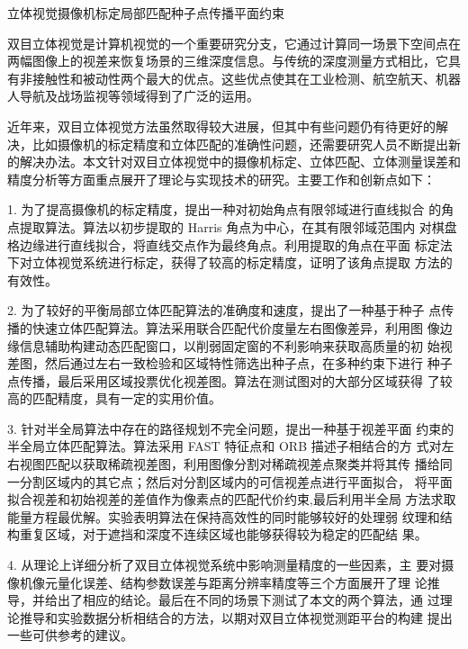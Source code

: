 \begin{Cabstract}{立体视觉}{摄像机标定}{局部匹配}{种子点传播}{平面约束}

双目立体视觉是计算机视觉的一个重要研究分支，它通过计算同一场景下空间点在两幅图像上的视差来恢复场景的三维深度信息。与传统的深度测量方式相比，它具有非接触性和被动性两个最大的优点。这些优点使其在工业检测、航空航天、机器人导航及战场监视等领域得到了广泛的运用。 

近年来，双目立体视觉方法虽然取得较大进展，但其中有些问题仍有待更好的解决，比如摄像机的标定精度和立体匹配的准确性问题，还需要研究人员不断提出新的解决办法。本文针对双目立体视觉中的摄像机标定、立体匹配、立体测量误差和精度分析等方面重点展开了理论与实现技术的研究。主要工作和创新点如下： 

1. 为了提高摄像机的标定精度，提出一种对初始角点有限邻域进行直线拟合
的角点提取算法。算法以初步提取的 Harris 角点为中心，在其有限邻域范围内
对棋盘格边缘进行直线拟合，将直线交点作为最终角点。利用提取的角点在平面
标定法下对立体视觉系统进行标定，获得了较高的标定精度，证明了该角点提取
方法的有效性。 

2. 为了较好的平衡局部立体匹配算法的准确度和速度，提出了一种基于种子
点传播的快速立体匹配算法。算法采用联合匹配代价度量左右图像差异，利用图
像边缘信息辅助构建动态匹配窗口，以削弱固定窗的不利影响来获取高质量的初
始视差图，然后通过左右一致检验和区域特性筛选出种子点，在多种约束下进行
种子点传播，最后采用区域投票优化视差图。算法在测试图对的大部分区域获得
了较高的匹配精度，具有一定的实用价值。 

3. 针对半全局算法中存在的路径规划不完全问题，提出一种基于视差平面
约束的半全局立体匹配算法。算法采用 FAST 特征点和 ORB 描述子相结合的方
式对左右视图匹配以获取稀疏视差图，利用图像分割对稀疏视差点聚类并将其传
播给同一分割区域内的其它点；然后对分割区域内的可信视差点进行平面拟合，
将平面拟合视差和初始视差的差值作为像素点的匹配代价约束,最后利用半全局
方法求取能量方程最优解。实验表明算法在保持高效性的同时能够较好的处理弱
纹理和结构重复区域，对于遮挡和深度不连续区域也能够获得较为稳定的匹配结
果。 

4. 从理论上详细分析了双目立体视觉系统中影响测量精度的一些因素，主
要对摄像机像元量化误差、结构参数误差与距离分辨率精度等三个方面展开了理
论推导，并给出了相应的结论。最后在不同的场景下测试了本文的两个算法，通
过理论推导和实验数据分析相结合的方法，以期对双目立体视觉测距平台的构建
提出一些可供参考的建议。
\end{Cabstract}
